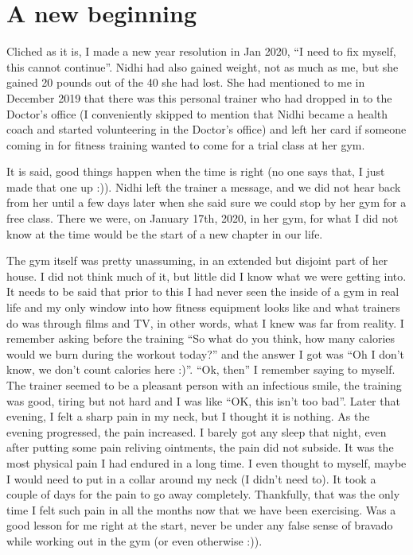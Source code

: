 \documentclass[
  oneside]{book}
\begin{document}
\hypertarget{a-new-beginning}{%
\section{A new beginning}\label{a-new-beginning}}

Cliched as it is, I made a new year resolution in Jan 2020, ``I need to fix myself, this cannot continue''. Nidhi had also gained weight, not as much as me, but she gained 20 pounds out of the 40 she had lost. She had mentioned to me in December 2019 that there was this personal trainer who had dropped in to the Doctor's office (I conveniently skipped to mention that Nidhi became a health coach and started volunteering in the Doctor's office) and left her card if someone coming in for fitness training wanted to come for a trial class at her gym.

It is said, good things happen when the time is right (no one says that, I just made that one up :)). Nidhi left the trainer a message, and we did not hear back from her until a few days later when she said sure we could stop by her gym for a free class. There we were, on January 17th, 2020, in her gym, for what I did not know at the time would be the start of a new chapter in our life.

The gym itself was pretty unassuming, in an extended but disjoint part of her house. I did not think much of it, but little did I know what we were getting into. It needs to be said that prior to this I had never seen the inside of a gym in real life and my only window into how fitness equipment looks like and what trainers do was through films and TV, in other words, what I knew was far from reality. I remember asking before the training ``So what do you think, how many calories would we burn during the workout today?'' and the answer I got was ``Oh I don't know, we don't count calories here :)''. ``Ok, then'' I remember saying to myself. The trainer seemed to be a pleasant person with an infectious smile, the training was good, tiring but not hard and I was like ``OK, this isn't too bad''. Later that evening, I felt a sharp pain in my neck, but I thought it is nothing. As the evening progressed, the pain increased. I barely got any sleep that night, even after putting some pain reliving ointments, the pain did not subside. It was the most physical pain I had endured in a long time. I even thought to myself, maybe I would need to put in a collar around my neck (I didn't need to). It took a couple of days for the pain to go away completely. Thankfully, that was the only time I felt such pain in all the months now that we have been exercising. Was a good lesson for me right at the start, never be under any false sense of bravado while working out in the gym (or even otherwise :)).
\end{document}
